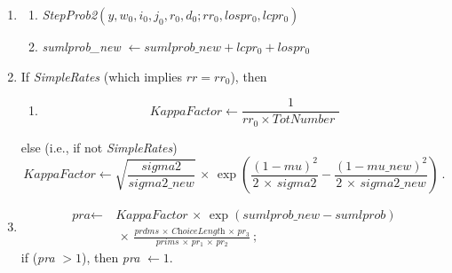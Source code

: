 \documentclass[a4paper,12pt,fleqn]{article}
\newcommand{\ttimes}{\,\times\,}
\newcommand{\ms}{\textsl{\textsf{\small ms}}} %
\begin{document}
\begin{enumerate}[resume]
\begin{enumerate}
      \item  \textit{sumlprob\_new} $ \leftarrow \textit{sumlprob\_new} + lcpr + lospr $
      \item If (not \textit{SimpleRates}), then
        \begin{enumerate}
        \item \textit{mu\_new} $ \leftarrow \textit{mu\_new} + rr $\ ;
        \item \textit{sigma2\_new} $ \leftarrow   \textit{sigma2\_new}  + (rr)^2  $ \ .
        \end{enumerate}
      \item\textit{ChangeStep}$(y, \ms)$
      \end{enumerate}
\item \begin{enumerate}
      \item \textit{StepProb2}$(y,w_0,i_0,j_0,r_0,d_0; rr_0, lospr_0, lcpr_0)$
      \item \textit{sumlprob\_new} $ \leftarrow \textit{sumlprob\_new} + lcpr_0 + lospr_0 $
      \end{enumerate}
\item If \textit{SimpleRates} (which implies $rr = rr_0$), then
      \begin{enumerate}
      \item  \begin{equation}
        \textit{KappaFactor} \leftarrow \frac{1}{rr_0 \times \textit{TotNumber } } \nonumber
        \end{equation}
      \end{enumerate}
      else (i.e., if not \textit{SimpleRates})
      \begin{equation}
      \textit{KappaFactor} \leftarrow \sqrt{ \frac{\textit{sigma2}}{\textit{sigma2\_new}} }
                  \ttimes \exp\left( \frac{\left(1 - \textit{mu} \right)^2}{2\ttimes\textit{sigma2}}
                   - \frac{\left(1 - \textit{mu\_new} \right)^2}{2\ttimes\textit{sigma2\_new}}  \right) \ .
      \end{equation}
\item  \begin{align}
     \textit{pra}  \leftarrow & \
        \textit{KappaFactor} \ttimes \exp(\textit{sumlprob\_new} - \textit{sumlprob}) \\
      & \ \ttimes  \frac{\textit{prdms} \ttimes \textit{ChoiceLength} \ttimes pr_3}
                        {\textit{prims} \ttimes pr_1 \ttimes pr_2}  \ ;
    \end{align}
    if (\textit{pra} $ > 1$), then  \textit{pra} $ \leftarrow 1 $.
\end{enumerate}
\end{document}
